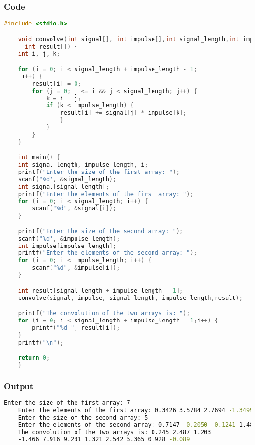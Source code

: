 \documentclass{article}
\begin{document}
\subsubsection{Code}
\begin{lstlisting}[language=C]
    #include <stdio.h>

    void convolve(int signal[], int impulse[],int signal_length,int impulse_length,
      int result[]) {
    int i, j, k;

    for (i = 0; i < signal_length + impulse_length - 1;
     i++) {
        result[i] = 0;
        for (j = 0; j <= i && j < signal_length; j++) {
            k = i - j;
            if (k < impulse_length) {
                result[i] += signal[j] * impulse[k];
                }
            }
        }
    }

    int main() {
    int signal_length, impulse_length, i;
    printf("Enter the size of the first array: ");
    scanf("%d", &signal_length);
    int signal[signal_length];
    printf("Enter the elements of the first array: ");
    for (i = 0; i < signal_length; i++) {
        scanf("%d", &signal[i]);
    }

    printf("Enter the size of the second array: ");
    scanf("%d", &impulse_length);
    int impulse[impulse_length];
    printf("Enter the elements of the second array: ");
    for (i = 0; i < impulse_length; i++) {
        scanf("%d", &impulse[i]);
    }

    int result[signal_length + impulse_length - 1];
    convolve(signal, impulse, signal_length, impulse_length,result);

    printf("The convolution of the two arrays is: ");
    for (i = 0; i < signal_length + impulse_length - 1;i++) {
        printf("%d ", result[i]);
    }
    printf("\n");

    return 0;
    }

\end{lstlisting}

\subsubsection{Output}
\begin{lstlisting}[language=Bash]
    Enter the size of the first array: 7
    Enter the elements of the first array: 0.3426 3.5784 2.7694 -1.3499 3.0349 0.7254 -0.0631
    Enter the size of the second array: 5
    Enter the elements of the second array: 0.7147 -0.2050 -0.1241 1.4897 1.4090
    The convolution of the two arrays is: 0.245 2.487 1.203 
    -1.466 7.916 9.231 1.321 2.542 5.365 0.928 -0.089
\end{lstlisting}
\end{document}
